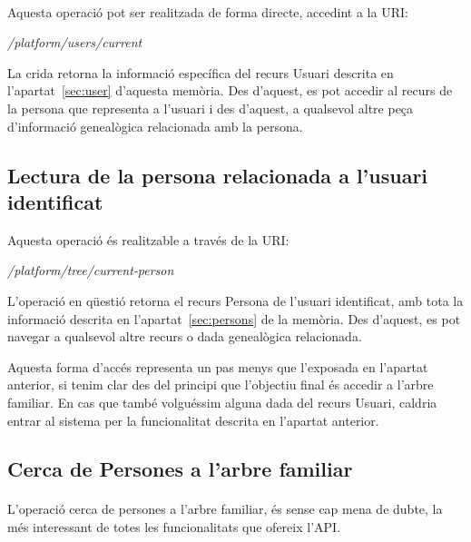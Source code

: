        \paragraph{}
        Aquesta operació pot ser realitzada de forma directe, accedint a la URI:

        \begin{displayquote}
            \emph{/platform/users/current}
        \end{displayquote}

        La crida retorna la informació específica del recurs Usuari descrita en l'apartat~\ref{sec:user} d'aquesta memòria. Des d'aquest, es pot accedir al recurs de la persona que re\-pre\-sen\-ta a l'usuari i des d’aquest, a qualsevol altre peça d'informació genealògica relacionada amb la persona.


    \subsection{Lectura de la persona relacionada a l'usuari identificat}

        Aquesta operació és realitzable a través de la URI:

        \begin{displayquote}
            \emph{/platform/tree/current-person}
        \end{displayquote}

        L'operació en qüestió retorna el recurs Persona de l'usuari identificat, amb tota la informació descrita en l'apartat~\ref{sec:persons} de la memòria. Des d'aquest, es pot navegar a qualsevol altre recurs o dada genealògica relacionada.

        Aquesta forma d'accés representa un pas menys que l’exposada en l’apartat anterior, si tenim clar des del principi que l'objectiu final és accedir a l'arbre familiar. En cas que també volguéssim alguna dada del recurs Usuari, caldria entrar al sistema per la funcionalitat descrita en l'apartat anterior.


    \subsection{Cerca de Persones a l'arbre familiar}

        \paragraph{}
        L'operació cerca de persones a l'arbre familiar, és sense cap mena de dubte, la més interessant de totes les funcionalitats que ofereix l'API.

